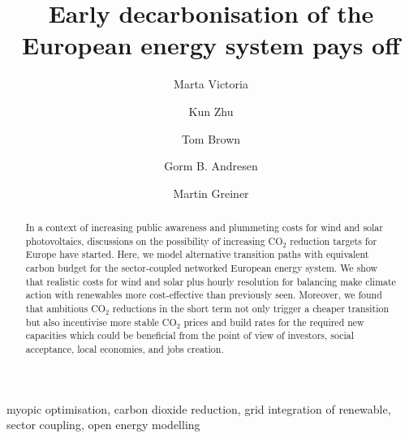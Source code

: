 \documentclass[5p]{elsarticle} %
\begin{document}
\begin{frontmatter}

\title{Early decarbonisation of the European energy system pays off}

\author[mymainaddress,iClimate]{Marta Victoria}
\author[mymainaddress]{Kun Zhu}
\author[kitaddress]{Tom Brown}
\author[mymainaddress,iClimate]{Gorm B. Andresen}
\author[mymainaddress,iClimate]{Martin Greiner}
\address[mymainaddress]{Department of Engineering, Aarhus University, Inge Lehmanns Gade 10, 8000 Aarhus, Denmark}
\address[iClimate]{iCLIMATE Interdisciplinary Centre for Climate Change, Aarhus University}
\address[kitaddress]{Institute for Automation and Applied Informatics (IAI), Karlsruhe Institute of Technology (KIT), Forschungszentrum 449, 76344, Eggenstein-Leopoldshafen, Germany}


\begin{abstract}

 In a context of increasing public awareness and plummeting costs for wind and solar photovoltaics, discussions on the possibility of increasing CO$_2$ reduction targets for Europe have started. Here, we model alternative transition paths with equivalent carbon budget for the sector-coupled networked European energy system. We show that realistic costs for wind and solar plus hourly resolution for balancing make climate action with renewables more cost-effective than previously seen. Moreover, we found that ambitious CO$_2$ reductions in the short term not only trigger a cheaper transition but also incentivise more stable CO$_2$ prices and build rates for the required new capacities which could be beneficial from the point of view of investors, social acceptance, local economies, and jobs creation.

\end{abstract}

\begin{keyword}
myopic optimisation, carbon dioxide reduction, grid integration of renewable, sector coupling, open energy modelling
\end{keyword}

\end{frontmatter}
\end{document}
